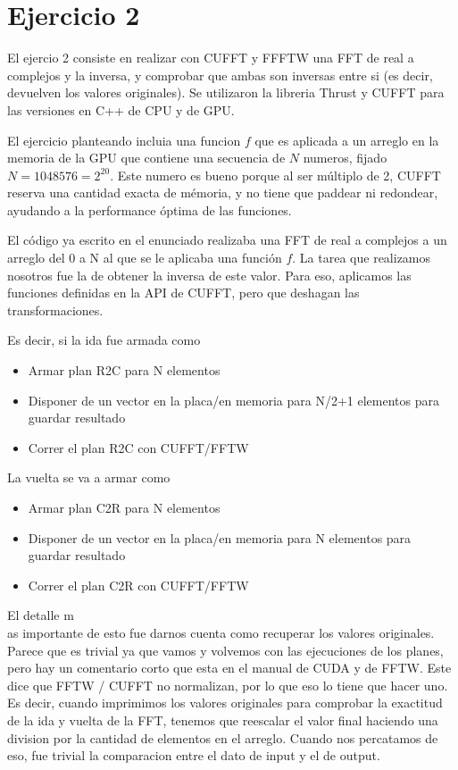 \section{Ejercicio 2}

El ejercio 2 consiste en realizar con CUFFT y FFFTW una FFT de real a complejos y la inversa,
y comprobar que ambas son inversas entre si (es decir, devuelven los valores originales).
Se utilizaron la libreria Thrust y CUFFT para las versiones en C++ de CPU y de GPU.

El ejercicio planteando incluia una funcion $f$ que es aplicada a un arreglo en la memoria de la GPU que contiene
una secuencia de $N$ numeros, fijado $N=1048576=2^{20}$. Este numero es bueno porque al ser m\'ultiplo de 2,
CUFFT reserva una cantidad exacta de m\'emoria, y no tiene que paddear ni redondear, ayudando a la performance 
\'optima de las funciones.

El c\'odigo ya escrito en el enunciado realizaba una FFT de real a complejos a un arreglo del 0 a N al que se
le aplicaba una funci\'on $f$. La tarea que realizamos nosotros fue la de obtener la inversa de este valor.
Para eso, aplicamos las funciones definidas en la API de CUFFT, pero que deshagan las transformaciones.

Es decir, si la ida fue armada como 
\begin{itemize}
    \item Armar plan R2C para N elementos
    \item Disponer de un vector en la placa/en memoria para N/2+1 elementos para guardar resultado
    \item Correr el plan R2C con CUFFT/FFTW
\end{itemize}

La vuelta se va a armar como

\begin{itemize}
    \item Armar plan C2R para N elementos
    \item Disponer de un vector en la placa/en memoria para N elementos para guardar resultado
    \item Correr el plan C2R con CUFFT/FFTW
\end{itemize}


El detalle m\\as importante de esto fue darnos cuenta como recuperar los valores originales. Parece que es trivial
ya que vamos y volvemos con las ejecuciones de los planes, pero hay un comentario corto que esta en el manual de CUDA y de 
FFTW. Este dice que FFTW / CUFFT no normalizan, por lo que eso lo tiene que hacer uno. Es decir, cuando imprimimos
los valores originales para comprobar la exactitud de la ida y vuelta de la FFT, tenemos que reescalar el valor
final haciendo una division por la cantidad de elementos en el arreglo. Cuando nos percatamos de eso, fue trivial
la comparacion entre el dato de input y el de output.

